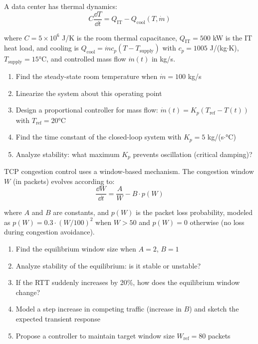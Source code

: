 \begin{exercise}
A data center has thermal dynamics:
\begin{equation}
C\frac{\dd T}{\dd t} = Q_{\text{IT}} - Q_{\text{cool}}(T, \dot{m})
\end{equation}

where $C = 5 \times 10^6$ J/K is the room thermal capacitance, $Q_{\text{IT}} = 500$ kW is the IT heat load, and cooling is $Q_{\text{cool}} = \dot{m} c_p (T - T_{\text{supply}})$ with $c_p = 1005$ J/(kg$\cdot$K), $T_{\text{supply}} = 15°$C, and controlled mass flow $\dot{m}(t)$ in kg/s.
\begin{enumerate}[label=(\alph*)]
    \item Find the steady-state room temperature when $\dot{m} = 100$ kg/s
    \item Linearize the system about this operating point
    \item Design a proportional controller for mass flow: $\dot{m}(t) = K_p(T_{\text{ref}} - T(t))$ with $T_{\text{ref}} = 20°$C
    \item Find the time constant of the closed-loop system with $K_p = 5$ kg/(s$\cdot$°C)
    \item Analyze stability: what maximum $K_p$ prevents oscillation (critical damping)?
\end{enumerate}
\end{exercise}

\begin{exercise}
TCP congestion control uses a window-based mechanism. The congestion window $W$ (in packets) evolves according to:
\begin{equation}
\frac{\dd W}{\dd t} = \frac{A}{W} - B \cdot p(W)
\end{equation}

where $A$ and $B$ are constants, and $p(W)$ is the packet loss probability, modeled as $p(W) = 0.3 \cdot (W/100)^2$ when $W > 50$ and $p(W) = 0$ otherwise (no loss during congestion avoidance).
\begin{enumerate}[label=(\alph*)]
    \item Find the equilibrium window size when $A = 2$, $B = 1$
    \item Analyze stability of the equilibrium: is it stable or unstable?
    \item If the RTT suddenly increases by 20\%, how does the equilibrium window change?
    \item Model a step increase in competing traffic (increase in $B$) and sketch the expected transient response
    \item Propose a controller to maintain target window size $W_{\text{ref}} = 80$ packets
\end{enumerate}
\end{exercise}

